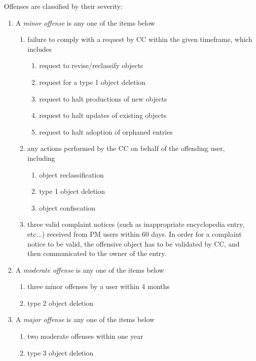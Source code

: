 Offenses are classified by their severity:
\begin{enumerate}
\item A \emph{minor offense} is any one of the items below
\begin{enumerate}
\item failure to comply with a request by CC within the given timeframe, which includes
\begin{enumerate}
\item request to revise/reclassify objects
\item request for a type 1 object deletion
\item request to halt productions of new objects
\item request to halt updates of existing objects
\item request to halt adoption of orphaned entries
\end{enumerate}

\item any actions performed by the CC on behalf of the offending user, including
\begin{enumerate}
\item object reclassification
\item type 1 object deletion
\item object confiscation
\end{enumerate}

\item three valid complaint notices (such as inappropriate encyclopedia entry, etc...) received from PM users within 60 days. In order for a complaint notice to be valid, the offensive object has to be validated by CC, and then communicated to the owner of the entry.
\end{enumerate}

\item A \emph{moderate offense} is any one of the items below
\begin{enumerate}
\item three minor offenses by a user within 4 months
\item type 2 object deletion
\end{enumerate}

\item A \emph{major offense} is any one of the items below
\begin{enumerate}
\item two moderate offenses within one year
\item type 3 object deletion
\end{enumerate}
\end{enumerate}

